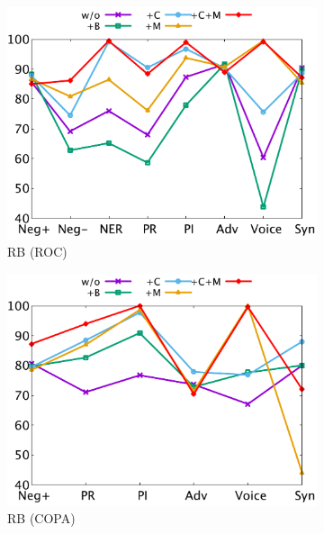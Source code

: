 \begin{figure}[th]
\begin{subfigure}[b]{0.24\textwidth}
\includegraphics[width=\columnwidth]{data/roc_roberta.pdf}
\caption{RB (ROC)}
\label{fig:roc_roberta}
\end{subfigure}
\hfill
\begin{subfigure}[b]{0.24\textwidth}
\centering
\includegraphics[width=\columnwidth]{data/copa_roberta.pdf}
\caption{RB (COPA)}
\label{fig:copa_roberta}
\end{subfigure}
\hfill
\begin{subfigure}[b]{0.24\textwidth}
\centering

\end{subfigure}
\end{figure}
